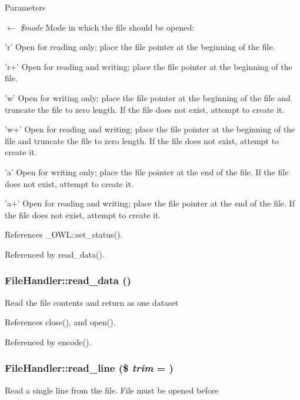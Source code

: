 \begin{DoxyParams}{Parameters}
\item[\mbox{$\leftarrow$} {\em \$mode}]Mode in which the file should be opened:
\begin{DoxyItemize}
\item 'r' Open for reading only; place the file pointer at the beginning of the file.
\item 'r+' Open for reading and writing; place the file pointer at the beginning of the file.
\item 'w' Open for writing only; place the file pointer at the beginning of the file and truncate the file to zero length. If the file does not exist, attempt to create it.
\item 'w+' Open for reading and writing; place the file pointer at the beginning of the file and truncate the file to zero length. If the file does not exist, attempt to create it.
\item 'a' Open for writing only; place the file pointer at the end of the file. If the file does not exist, attempt to create it.
\item 'a+' Open for reading and writing; place the file pointer at the end of the file. If the file does not exist, attempt to create it. 
\end{DoxyItemize}\end{DoxyParams}


References \_\-OWL::set\_\-status().



Referenced by read\_\-data().

\subsubsection[{read\_\-data}]{\setlength{\rightskip}{0pt plus 5cm}FileHandler::read\_\-data ()}\label{classFileHandler_a1389a6ea19a22471c301d70b5ed68ed8}
Read the file contents and return as one dataset 

References close(), and open().



Referenced by encode().

\subsubsection[{read\_\-line}]{\setlength{\rightskip}{0pt plus 5cm}FileHandler::read\_\-line (\$ {\em trim} = {})}\label{classFileHandler_a69f84a8138f717c84f560125f1f95448}
Read a single line from the file. File must be opened before


